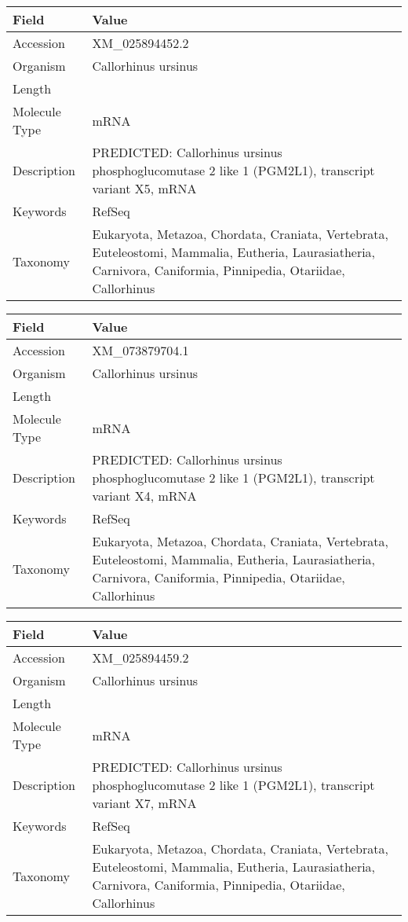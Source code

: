 \documentclass[10pt]{article}
\begin{document}
\vspace{1em}
{\footnotesize
\begin{longtable}{>{\raggedright\arraybackslash}p{4.5cm} >{\raggedright\arraybackslash}p{11.5cm}}
\textbf{Field} & \textbf{Value} \\
\hline
Accession & XM\_025894452.2 \\
Organism & Callorhinus ursinus \\
Length & 2783 \\
Molecule Type & mRNA \\
Description & PREDICTED: Callorhinus ursinus phosphoglucomutase 2 like 1 (PGM2L1), transcript variant X5, mRNA \\
Keywords & RefSeq \\
Taxonomy & Eukaryota, Metazoa, Chordata, Craniata, Vertebrata, Euteleostomi, Mammalia, Eutheria, Laurasiatheria, Carnivora, Caniformia, Pinnipedia, Otariidae, Callorhinus \\
\end{longtable}
}

\vspace{1em}
{\footnotesize
\begin{longtable}{>{\raggedright\arraybackslash}p{4.5cm} >{\raggedright\arraybackslash}p{11.5cm}}
\textbf{Field} & \textbf{Value} \\
\hline
Accession & XM\_073879704.1 \\
Organism & Callorhinus ursinus \\
Length & 2823 \\
Molecule Type & mRNA \\
Description & PREDICTED: Callorhinus ursinus phosphoglucomutase 2 like 1 (PGM2L1), transcript variant X4, mRNA \\
Keywords & RefSeq \\
Taxonomy & Eukaryota, Metazoa, Chordata, Craniata, Vertebrata, Euteleostomi, Mammalia, Eutheria, Laurasiatheria, Carnivora, Caniformia, Pinnipedia, Otariidae, Callorhinus \\
\end{longtable}
}

\vspace{1em}
{\footnotesize
\begin{longtable}{>{\raggedright\arraybackslash}p{4.5cm} >{\raggedright\arraybackslash}p{11.5cm}}
\textbf{Field} & \textbf{Value} \\
\hline
Accession & XM\_025894459.2 \\
Organism & Callorhinus ursinus \\
Length & 2612 \\
Molecule Type & mRNA \\
Description & PREDICTED: Callorhinus ursinus phosphoglucomutase 2 like 1 (PGM2L1), transcript variant X7, mRNA \\
Keywords & RefSeq \\
Taxonomy & Eukaryota, Metazoa, Chordata, Craniata, Vertebrata, Euteleostomi, Mammalia, Eutheria, Laurasiatheria, Carnivora, Caniformia, Pinnipedia, Otariidae, Callorhinus \\
\end{longtable}
}
\end{document}
